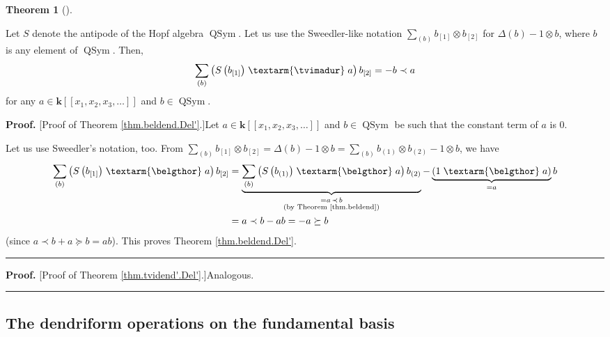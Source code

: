\documentclass[numbers=enddot,12pt,final,onecolumn,notitlepage]{scrartcl}%
\theoremstyle{definition}
\newtheorem{theo}{Theorem}[section]
\newenvironment{theorem}[1][]
{\begin{theo}[#1]\begin{leftbar}}
{\end{leftbar}\end{theo}}
\newenvironment{proof}[1][Proof]{\noindent\textbf{#1.} }{\ \rule{0.5em}{0.5em}}
\newenvironment{verlong}{}{}
\newenvironment{noncompile}{}{}
\newcommand{\tvi}{\left. \textarm{\tvimadur} \right.}
\newcommand{\bel}{\left. \textarm{\belgthor} \right.}
\let\sumnonlimits\sum
\renewcommand{\sum}{\sumnonlimits\limits}
\begin{document}
\begin{verlong}
\begin{noncompile}
\begin{theorem}
\label{thm.tvidend'.Del'}Let $S$ denote the antipode of the Hopf algebra
$\operatorname*{QSym}$. Let us use the Sweedler-like notation $\sum_{\left(
b\right)  }b_{\left[  1\right]  }\otimes b_{\left[  2\right]  }$ for
$\Delta\left(  b\right)  -1\otimes b$, where $b$ is any element of
$\operatorname*{QSym}$. Then,%
\[
\sum_{\left(  b\right)  }\left(  S\left(  b_{\left[  1\right]  }\right)
\tvi
a\right)  b_{\left[  2\right]  }=-b\left.  \prec\right.  a
\]
for any $a\in\mathbf{k}\left[  \left[  x_{1},x_{2},x_{3},\ldots\right]
\right]  $ and $b\in\operatorname*{QSym}$.
\end{theorem}

\begin{proof}
[Proof of Theorem \ref{thm.beldend.Del'}.]Let
$a\in\mathbf{k}\left[  \left[  x_{1},x_{2},x_{3},\ldots\right]
\right]  $ and $b\in\operatorname*{QSym}$ be such that the constant term
of $a$ is $0$.

Let us use Sweedler's notation, too.
From $\sum_{\left(  b\right)  }b_{\left[  1\right]  }\otimes b_{\left[
2\right]  }=\Delta\left(  b\right)  -1\otimes b=\sum_{\left(  b\right)
}b_{\left(  1\right)  }\otimes b_{\left(  2\right)  }-1\otimes b$, we have%
\begin{align*}
\sum_{\left(  b\right)  }\left(  S\left(  b_{\left[  1\right]  }\right)
\bel a\right)  b_{\left[  2\right]  }  &  =\underbrace{\sum_{\left(  b\right)
}\left(  S\left(  b_{\left(  1\right)  }\right)  \bel a\right)  b_{\left(
2\right)  }}_{\substack{=a\left.  \prec\right.  b\\\text{(by Theorem
\ref{thm.beldend})}}}-\underbrace{\left(  1\bel a\right)  }_{=a}b\\
&  =a\left.  \prec\right.  b-ab=-a\left.  \succeq\right.  b
\end{align*}
(since $a\left.  \prec\right.  b+a\left.  \succeq\right.  b=ab$). This proves
Theorem \ref{thm.beldend.Del'}.
\end{proof}

\begin{proof}
[Proof of Theorem \ref{thm.tvidend'.Del'}.]Analogous.
\end{proof}
\end{noncompile}

\subsection{The dendriform operations on the fundamental basis}


\end{verlong}
\end{document}
